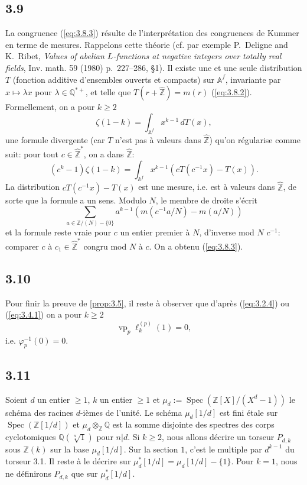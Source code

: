 \documentclass[12pt,a4paper]{article}
\theoremstyle{plain}
\theoremstyle{definition}
\theoremstyle{remark}
\DeclareMathOperator{\Spec}{Spec}
\providecommand{\Spec}{\operatorname{Spec}}
\begin{document}
\subsection*{3.9}

La congruence (\ref{eq:3.8.3}) r\'esulte de l'interpr\'etation des congruences de
Kummer en terme de mesures. Rappelons cette th\'eorie (cf. par exemple P.~Deligne and
K.~Ribet, \textit{Values of abelian $L$-functions at negative integers over totally real
fields}, Inv. math. 59 (1980) p.~227--286, \S1). Il existe une et une seule distribution
$T$ (fonction additive d'ensembles ouverts et compacts) sur $\mathbb{A}^f$, invariante par
$x \mapsto \lambda x$ pour $\lambda \in \mathbb{Q}^{*+}$, et telle que $T(r + \hat{\mathbb{Z}})
= m(r)$ (\ref{eq:3.8.2}). Formellement, on a pour $k \geq 2$
\[
\zeta(1-k) = \int_{\mathbb{A}^f} x^{k-1} \, dT(x),
\]
une formule divergente (car $T$ n'est pas \`a valeurs dans $\hat{\mathbb{Z}}$) qu'on
r\'egularise comme suit: pour tout $c \in \hat{\mathbb{Z}}^*$, on a dans $\hat{\mathbb{Z}}$:
\begin{equation}\label{eq:3.9.1}
(c^k-1)\zeta(1-k) = \int_{\mathbb{A}^f} x^{k-1}(cT(c^{-1}x) - T(x)).
\end{equation}
La distribution $cT(c^{-1}x) - T(x)$ est une mesure, i.e. est \`a valeurs dans
$\hat{\mathbb{Z}}$, de sorte que la formule a un sens. Modulo $N$, le membre de droite
s'\'ecrit
\[
\sum_{a \in \mathbb{Z}/(N)-\{0\}} a^{k-1}(m(c^{-1}a/N) - m(a/N))
\]
et la formule reste vraie pour $c$ un entier premier \`a $N$, d'inverse mod $N$
$c^{-1}$: comparer $c$ \`a $c_1 \in \hat{\mathbb{Z}}^*$ congru mod $N$ \`a $c$. On a obtenu
(\ref{eq:3.8.3}).

\subsection*{3.10}

Pour finir la preuve de \ref{prop:3.5}, il reste \`a observer que d'apr\`es
(\ref{eq:3.2.4}) ou (\ref{eq:3.4.1}) on a pour $k \geq 2$
\[
\operatorname{vp}_p \ell_k^{(p)}(1) = 0,
\]
i.e. $\varphi_p^{-1}(0) = 0$.

\subsection*{3.11}

Soient $d$ un entier $\geq 1$, $k$ un entier $\geq 1$ et
$\mu_d:=\Spec(\mathbb{Z}[X]/(X^d-1))$ le sch\'ema des racines $d$-i\`emes de l'unit\'e. Le
sch\'ema $\mu_d[1/d]$ est fini \'etale sur $\Spec(\mathbb{Z}[1/d])$ et
$\mu_d \otimes_{\mathbb{Z}} \mathbb{Q}$ est la somme disjointe des spectres des corps
cyclotomiques $\mathbb{Q}(\sqrt[n]{1})$ pour $n|d$. Si $k \geq 2$, nous allons d\'ecrire
un torseur $P_{d,k}$ sous $\mathbb{Z}(k)$ sur la base $\mu_d[1/d]$. Sur la section $1$,
c'est le multiple par $d^{k-1}$ du torseur 3.1. Il reste \`a le d\'ecrire sur
$\mu_d^*[1/d] = \mu_d[1/d] - \{1\}$. Pour $k = 1$, nous ne d\'efinirons $P_{d,k}$ que
sur $\mu_d^*[1/d]$.
\end{document}
